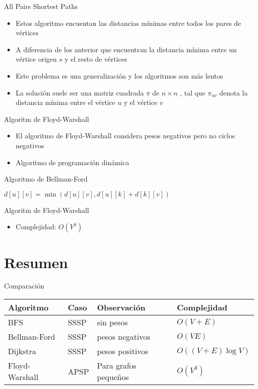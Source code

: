 \documentclass[]{beamer}
\begin{document}
\begin{frame}{All Pairs Shortest Paths}
  \begin{itemize}
    \item Estos algoritmo encuentan las distancias m\'inimas entre todos los pares de v\'ertices
      \pause
    \item A diferencia de los anterior que encuentran la distancia m\'inima entre un v\'ertice origen $s$ y el resto de v\'ertices
      \pause
    \item Este problema es una generalizaci\'on y los algoritmos son m\'as lentos
      \pause
    \item La soluci\'on suele ser una matriz cuadrada $\pi$ de $n \times n$ , tal que $\pi_{uv}$ denota la distancia m\'inima entre el v\'ertice $u$ y el v\'ertice $v$
  \end{itemize}
\end{frame}

\begin{frame}{Algoritm de Floyd-Warshall}
  \begin{itemize}
    \item El algoritmo de Floyd-Warshall considera pesos negativos pero no ciclos negativos
      \pause
    \item Algoritmo de programaci\'on din\'amica
  \end{itemize}
\end{frame}

\begin{frame}{Algoritmo de Bellman-Ford}
  \begin{algorithm}[H]
    {
      {
        {
          $d[u][v] = \min(d[u][v], d[u][k]+d[k][v])$
        }
      }
    }
  \end{algorithm}
\end{frame}

\begin{frame}{Algoritm de Floyd-Warshall}
  \begin{itemize}
    \item Complejidad: $O(V^3)$
  \end{itemize}
\end{frame}

\section{Resumen}
\begin{frame}{Comparaci\'on}
  \begin{tabular}{l|l|l|l}
    Algoritmo      & Caso & Observaci\'on          & Complejidad \\ \hline
    BFS            & SSSP & sin pesos              & $O(V+E) $ \\
    Bellman-Ford   & SSSP & pesos negativos        & $O(VE)$ \\
    Dijkstra       & SSSP & pesos positivos        & $O((V+E) \log V)$\\
    Floyd-Warshall & APSP & Para grafos peque\~nos & $O(V^3)$ 
  \end{tabular}
\end{frame}
\end{document}
